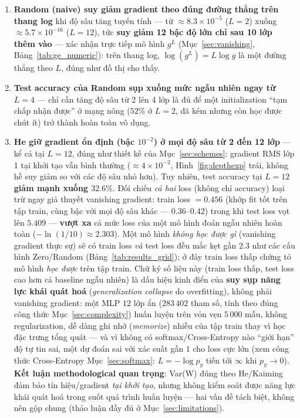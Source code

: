 \documentclass[12pt,a4paper]{article}
\newcommand{\en}[1]{\textit{#1}}
\begin{document}
\begin{enumerate}
\item \textbf{Random (naive) suy giảm gradient theo đúng đường thẳng trên
  thang log} khi độ sâu tăng tuyến tính --- từ $\approx8.3\times10^{-5}$
  ($L{=}2$) xuống $\approx5.7\times10^{-16}$ ($L{=}12$), tức
  \textbf{suy giảm 12 bậc độ lớn chỉ sau 10 lớp thêm vào} --- xác nhận
  trực tiếp mô hình $g^L$ (Mục~\ref{sec:vanishing}, Bảng~\ref{tab:ge_numeric}):
  trên thang log, $\log(g^L)=L\log g$ là một đường thẳng theo $L$, đúng
  như đồ thị cho thấy.
\item \textbf{Test accuracy của Random sụp xuống mức ngẫu nhiên ngay từ
  $L{=}4$} --- chỉ cần tăng độ sâu từ 2 lên 4 lớp là đủ để một
  initialization ``tạm chấp nhận được'' ở mạng nông ($52\%$ ở $L{=}2$, đã
  kém nhưng còn học được chút ít) trở thành hoàn toàn vô dụng.
\item \textbf{He giữ gradient ổn định (bậc $10^{-2}$) ở mọi độ sâu từ 2
  đến 12 lớp} --- kể cả tại $L{=}12$, đúng như thiết kế của
  Mục~\ref{sec:schemes}: gradient RMS lớp 1 tại khởi tạo vẫn bình thường
  ($\approx4\times10^{-2}$, Hình~\ref{fig:depthexp} trái, không hề suy
  giảm so với các độ sâu nhỏ hơn). Tuy nhiên, test accuracy tại $L{=}12$
  \textbf{giảm mạnh xuống $32.6\%$}. Đối chiếu \emph{cả hai} loss (không
  chỉ accuracy) loại trừ ngay giả thuyết vanishing gradient:
  train loss $=0.456$ (khớp fit tốt trên tập train, cùng bậc với mọi độ
  sâu khác --- $0.36$--$0.42$) trong khi test loss vọt lên
  $5.409$ --- \textbf{vượt xa} cả mức loss của một mô hình đoán ngẫu
  nhiên hoàn toàn ($-\ln(1/10)\approx2.303$). Một mô hình \emph{không
  học được gì} (vanishing gradient thực sự) sẽ có train loss \emph{và}
  test loss đều mắc kẹt gần $2.3$ như các cấu hình Zero/Random
  (Bảng~\ref{tab:results_grid}); ở đây train loss thấp chứng tỏ mô hình
  \emph{học được} trên tập train. Chữ ký số liệu này (train loss thấp,
  test loss cao hơn cả baseline ngẫu nhiên) là dấu hiệu kinh điển của
  \textbf{suy sụp năng lực khái quát hoá} (\en{generalization collapse}
  do overfitting), không phải vanishing gradient: một MLP $12$ lớp ẩn
  ($283\,402$ tham số, tính theo đúng công thức Mục~\ref{sec:complexity})
  huấn luyện trên vỏn vẹn $5\,000$ mẫu, không regularization, dễ dàng ghi
  nhớ (\en{memorize}) nhiễu của tập train thay vì học đặc trưng tổng
  quát --- và vì không có softmax/Cross-Entropy nào ``giới hạn'' độ tự
  tin sai, một dự đoán sai với xác suất gần $1$ cho loss cực lớn (xem
  công thức Cross-Entropy Mục~\ref{sec:softmax}: $L=-\log p_{y}$ tiến tới
  $\infty$ khi $p_y\to0$). \textbf{Kết luận methodological quan trọng}:
  Var(W) đúng theo He/Kaiming đảm bảo tín hiệu/gradient \emph{tại khởi
  tạo}, nhưng không kiểm soát được năng lực khái quát hoá trong suốt quá
  trình huấn luyện --- hai vấn đề tách biệt, không nên gộp chung (thảo
  luận đầy đủ ở Mục~\ref{sec:limitations}).
\end{enumerate}
\end{document}

